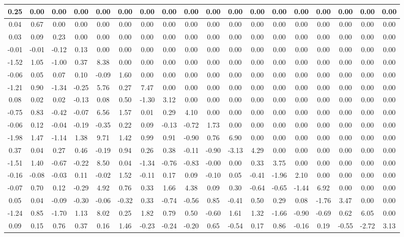 \begin{footnotesize}\begin{tabular}{|c|c|c|c|c|c|c|c|c|c|c|c|c|c|c|c|c|c|}
\hline
0.25&0.00&0.00&0.00&0.00&0.00&0.00&0.00&0.00&0.00&0.00&0.00&0.00&0.00&0.00&0.00&0.00&0.00\\\hline
0.04&0.67&0.00&0.00&0.00&0.00&0.00&0.00&0.00&0.00&0.00&0.00&0.00&0.00&0.00&0.00&0.00&0.00\\\hline
0.03&0.09&0.23&0.00&0.00&0.00&0.00&0.00&0.00&0.00&0.00&0.00&0.00&0.00&0.00&0.00&0.00&0.00\\\hline
-0.01&-0.01&-0.12&0.13&0.00&0.00&0.00&0.00&0.00&0.00&0.00&0.00&0.00&0.00&0.00&0.00&0.00&0.00\\\hline
-1.52&1.05&-1.00&0.37&8.38&0.00&0.00&0.00&0.00&0.00&0.00&0.00&0.00&0.00&0.00&0.00&0.00&0.00\\\hline
-0.06&0.05&0.07&0.10&-0.09&1.60&0.00&0.00&0.00&0.00&0.00&0.00&0.00&0.00&0.00&0.00&0.00&0.00\\\hline
-1.21&0.90&-1.34&-0.25&5.76&0.27&7.47&0.00&0.00&0.00&0.00&0.00&0.00&0.00&0.00&0.00&0.00&0.00\\\hline
0.08&0.02&0.02&-0.13&0.08&0.50&-1.30&3.12&0.00&0.00&0.00&0.00&0.00&0.00&0.00&0.00&0.00&0.00\\\hline
-0.75&0.83&-0.42&-0.07&6.56&1.57&0.01&0.29&4.10&0.00&0.00&0.00&0.00&0.00&0.00&0.00&0.00&0.00\\\hline
-0.06&0.12&-0.04&-0.19&-0.35&0.22&0.09&-0.13&-0.72&1.73&0.00&0.00&0.00&0.00&0.00&0.00&0.00&0.00\\\hline
-1.98&1.47&-1.14&1.38&9.71&1.42&0.99&0.91&-0.90&0.76&6.90&0.00&0.00&0.00&0.00&0.00&0.00&0.00\\\hline
0.37&0.04&0.27&0.46&-0.19&0.94&0.26&0.38&-0.11&-0.90&-3.13&4.29&0.00&0.00&0.00&0.00&0.00&0.00\\\hline
-1.51&1.40&-0.67&-0.22&8.50&0.04&-1.34&-0.76&-0.83&-0.00&0.00&0.33&3.75&0.00&0.00&0.00&0.00&0.00\\\hline
-0.16&-0.08&-0.03&0.11&-0.02&1.52&-0.11&0.17&0.09&-0.10&0.05&-0.41&-1.96&2.10&0.00&0.00&0.00&0.00\\\hline
-0.07&0.70&0.12&-0.29&4.92&0.76&0.33&1.66&4.38&0.09&0.30&-0.64&-0.65&-1.44&6.92&0.00&0.00&0.00\\\hline
0.05&0.04&-0.09&-0.30&-0.06&-0.32&0.33&-0.74&-0.56&0.85&-0.41&0.50&0.29&0.08&-1.76&3.47&0.00&0.00\\\hline
-1.24&0.85&-1.70&1.13&8.02&0.25&1.82&0.79&0.50&-0.60&1.61&1.32&-1.66&-0.90&-0.69&0.62&6.05&0.00\\\hline
0.09&0.15&0.76&0.37&0.16&1.46&-0.23&-0.24&-0.20&0.65&-0.54&0.17&0.86&-0.16&0.19&-0.55&-2.72&3.13\\\hline
\end{tabular}
\end{footnotesize}